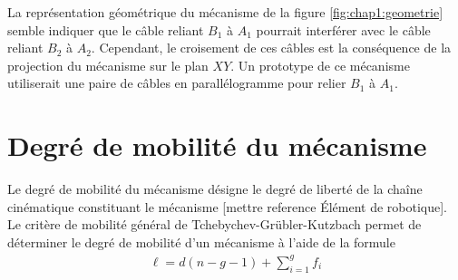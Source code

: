 La représentation géométrique du mécanisme de la figure \ref{fig:chap1:geometrie} semble indiquer que le câble reliant $B_1$ à $A_1$ pourrait interférer avec le câble reliant $B_2$ à $A_2$. Cependant, le croisement de ces câbles est la conséquence de la projection du mécanisme sur le plan $XY$. Un prototype de ce mécanisme utiliserait une paire de câbles en parallélogramme pour relier $B_1$ à $A_1$.

\section{Degré de mobilité du mécanisme}
Le degré de mobilité du mécanisme désigne le degré de liberté de la chaîne cinématique constituant le mécanisme [mettre reference Élément de robotique]. Le critère de mobilité général de Tchebychev-Grübler-Kutzbach permet de déterminer le degré de mobilité d'un mécanisme à l'aide de la formule
\begin{align}
\ell = d\left(n-g-1\right) + \sum_{i=1}^g f_i
\end{align}
